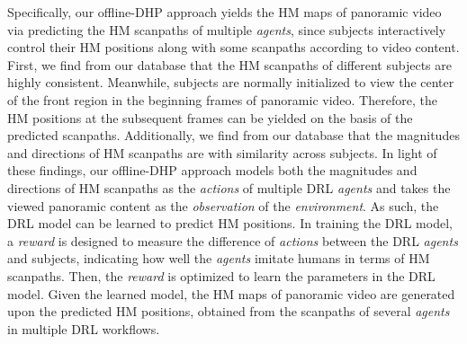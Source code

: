 \documentclass[10pt,journal,compsoc]{IEEEtran}
\begin{document}

Specifically, our offline-DHP approach yields the HM maps of panoramic video via predicting the HM scanpaths of multiple \textit{agents}, since subjects interactively control their HM positions along with some scanpaths according to video content.
First, we find from our database that the HM scanpaths of different subjects are highly consistent.
Meanwhile, subjects are normally initialized to view the center of the front region in the beginning frames of panoramic video.
Therefore, the HM positions at the subsequent frames can be yielded on the basis of the predicted scanpaths.
Additionally, we find from our database that the magnitudes and directions of HM scanpaths are with similarity across subjects.
In light of these findings, our offline-DHP approach models both the magnitudes and directions of HM scanpaths as the \textit{actions} of multiple DRL \textit{agents} and takes the viewed panoramic content as the \textit{observation} of the \textit{environment}.
As such, the DRL model can be learned to predict HM positions.
In training the DRL model, a \textit{reward} is designed to measure the difference of \textit{actions}  between the DRL \textit{agents} and subjects, indicating how well the \textit{agents} imitate humans in terms of HM scanpaths.
Then, the \textit{reward} is optimized to learn the parameters in the DRL model.
Given the learned model, the HM maps of panoramic video are generated upon the predicted HM positions, obtained from the scanpaths of several \textit{agents} in multiple DRL workflows.

\end{document}
